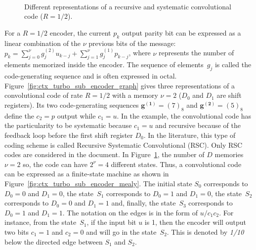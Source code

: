 \begin{figure}[htp]
  \centering
  \quad
  \\
  \caption{Different representations of a recursive and systematic convolutional
           code ($R = 1/2$).}
  \label{fig:ctx_turbo_sub_encoder}
\end{figure}

For a $R=1/2$ encoder, the current $p_k$ output parity bit can be expressed as a
linear combination of the $\nu$ previous bits of the message:
$p_k = \sum_{j=0}^\nu g^{(2)}_{j} u_{k-j} + \sum_{j=1}^\nu g^{(1)}_{j} p_{k-j}$,
where $\nu$ represents the number of elements memorized inside the encoder.
The sequence of elements~$g_j$ is called the code-generating sequence and is
often expressed in octal. Figure~\ref{fig:ctx_turbo_sub_encoder_graph} gives
three representations of a convolutional code of rate $R = 1/2$ with a memory
$\nu = 2$ ($D_0$ and $D_1$ are shift registers). Its two code-generating
sequences $\bm{g^{(1)}} = (7)_8$ and $\bm{g^{(2)}} = (5)_8$ define the $c_2 = p$
output while $c_1 = u$. In the example, the convolutional code has the
particularity to be systematic because $c_1 = u$ and recursive because of the
feedback loop before the first shift register $D_0$. In the literature, this
type of coding scheme is called Recursive Systematic Convolutional (RSC). Only
RSC codes are considered in the document. In
Figure~\ref{fig:ctx_turbo_sub_encoder}, the number of $D$ memories $\nu = 2$ so,
the code can have $2^\nu = 4$ different states. Thus, a convolutional code can
be expressed as a finite-state machine as shown in
Figure~\ref{fig:ctx_turbo_sub_encoder_mealy}. The initial state $S_0$
corresponds to $D_0 = 0$ and $D_1 = 0$, the state~$S_1$ corresponds to $D_0 = 1$
and $D_1 = 0$, the state~$S_2$ corresponds to $D_0 = 0$ and $D_1 = 1$ and,
finally, the state~$S_3$ corresponds to $D_0 = 1$ and $D_1 = 1$. The notation on
the edges is in the form of $u/c_1c_2$. For instance, from the state~$S_1$, if
the input bit $u$ is 1, then the encoder will output two bits $c_1 = 1$ and
$c_2 = 0$ and will go in the state~$S_2$. This is denoted by \emph{1/10} below
the directed edge between $S_1$ and $S_2$.

